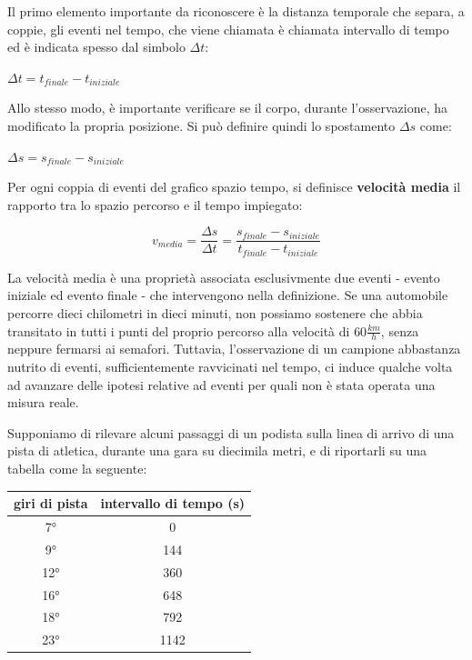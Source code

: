 Il primo elemento importante da riconoscere è la distanza temporale che separa, a coppie, gli eventi nel tempo, che viene chiamata è chiamata intervallo di tempo ed è indicata spesso dal simbolo $\Delta t$:
\begin{center}
\begin{math}
\Delta t = t_{finale}-t_{iniziale}
\end{math}
\end{center}
Allo stesso modo, è importante verificare se il corpo, durante l'osservazione, ha modificato la propria posizione. Si può definire quindi lo spostamento $\Delta s$ come:
\begin{center}
\begin{math}
\Delta s = s_{finale} - s_{iniziale}
\end{math}
\end{center}
Per ogni coppia di eventi del grafico spazio tempo, si definisce {\bf velocità media} il rapporto tra lo spazio percorso e il tempo impiegato:
\begin{center}
\begin{equation}
v_{media}=\frac {\Delta s}{\Delta t}=\frac {s_{finale} -s_{iniziale}}{t_{finale}-t_{iniziale}}
\end{equation}
\end{center}
La velocità media è una proprietà associata esclusivmente due eventi - evento iniziale ed evento finale - che intervengono nella definizione. Se una automobile percorre dieci chilometri in dieci minuti, non possiamo sostenere che abbia transitato in tutti i punti del proprio percorso alla velocità di $60 \frac {km}{h}$, senza neppure fermarsi ai semafori. Tuttavia, l'osservazione di un campione abbastanza nutrito di eventi, sufficientemente ravvicinati nel tempo, ci induce qualche volta ad avanzare delle ipotesi relative ad eventi per quali non è stata operata una misura reale.
\newline

Supponiamo di rilevare alcuni passaggi di un podista sulla linea di arrivo di una pista di atletica, durante una gara su diecimila metri, e di riportarli su una tabella come la seguente:
\begin{center}
\begin{tabular}{| c | c |}
\hline
giri di pista & intervallo di tempo (s) \\
\hline
7° &  0 \\
\hline
9° & 144 \\
\hline
12° & 360 \\
\hline
16° & 648 \\
\hline
18° & 792 \\
\hline
23° & 1142 \\
\hline
\end{tabular}
\end{center}

